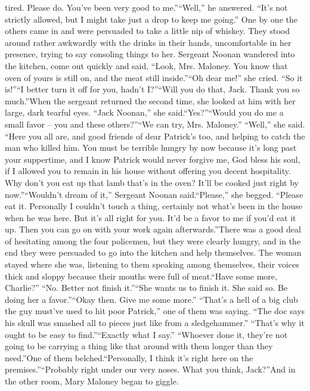 \documentclass[11pt,a4paper]{article}
\begin{document}
{tired. Please do. You’ve been very good to me.”“Well,” he answered. “It’s not strictly allowed, but I might take just a drop to keep me going.” One by one the others came in and were persuaded to take a little nip of whiskey. They stood around rather awkwardly with the drinks in their hands, uncomfortable in her presence, trying to say consoling things to her. Sergeant Noonan wandered into the kitchen, come out quickly and said, “Look, Mrs. Maloney. You know that oven of yours is still on, and the meat still inside.”“Oh dear me!” she cried. “So it is!”“I better turn it off for you, hadn’t I?”“Will you do that, Jack. Thank you so much.”When the sergeant returned the second time, she looked at him with her large, dark tearful eyes. “Jack Noonan,” she said.“Yes?”“Would you do me a small favor – you and these others?”“We can try, Mrs. Maloney.” “Well,” she said. “Here you all are, and good friends of dear Patrick’s too, and helping to catch the man who killed him. You must be terrible hungry by now because it’s long past your suppertime, and I know Patrick would never forgive me, God bless his soul, if I allowed you to remain in his house without offering you decent hospitality. Why don’t you eat up that lamb that’s in the oven? It’ll be cooked just right by now.”“Wouldn’t dream of it,” Sergeant Noonan said.“Please,” she begged. “Please eat it. Personally I couldn’t touch a thing, certainly not what’s been in the house when he was here. But it’s all right for you. It’d be a favor to me if you’d eat it up. Then you can go on with your work again afterwards.”There was a good deal of hesitating among the four policemen, but they were clearly hungry, and in the end they were persuaded to go into the kitchen and help themselves. The woman stayed where she was, listening to them speaking among themselves, their voices thick and sloppy because their mouths were full of meat.“Have some more, Charlie?” “No. Better not finish it.”“She wants us to finish it. She said so. Be doing her a favor.”“Okay then. Give me some more.” “That’s a hell of a big club the guy must’ve used to hit poor Patrick,” one of them was saying. “The doc says his skull was smashed all to pieces just like from a sledgehammer.” “That’s why it ought to be easy to find.”“Exactly what I say.” “Whoever done it, they’re not going to be carrying a thing like that around with them longer than they need.”One of them belched.“Personally, I think it’s right here on the premises.”“Probably right under our very noses. What you think, Jack?”And in the other room, Mary Maloney began to giggle.	
	}
	
\end{document}
